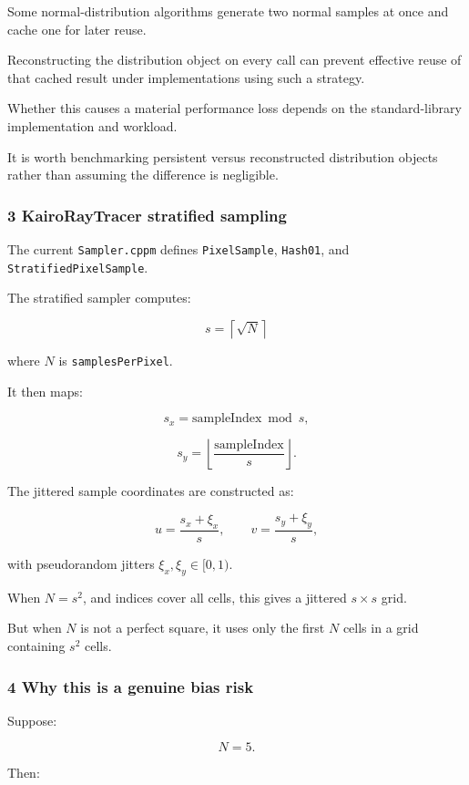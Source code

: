 Some normal-distribution algorithms generate two normal samples at once and cache one for later reuse.

Reconstructing the distribution object on every call can prevent effective reuse of that cached result under implementations using such a strategy.

Whether this causes a material performance loss depends on the standard-library implementation and workload.

It is worth benchmarking persistent versus reconstructed distribution objects rather than assuming the difference is negligible.

\subsubsection{3 KairoRayTracer stratified sampling}\label{02-foundations-ii-ch039-kairoraytracer-stratified-sampling}

The current \texttt{Sampler.cppm} defines \texttt{PixelSample}, \texttt{Hash01}, and \texttt{StratifiedPixelSample}.

The stratified sampler computes:

\[
 s=\left\lceil\sqrt N\right\rceil
\]

where \(N\) is \texttt{samplesPerPixel}.

It then maps:

\[
 s_x=\text{sampleIndex}\bmod s,
\]

\[
 s_y=\left\lfloor\frac{\text{sampleIndex}}s\right\rfloor.
\]

The jittered sample coordinates are constructed as:

\[
 u=\frac{s_x+\xi_x}{s}, \qquad v=\frac{s_y+\xi_y}{s},
\]

with pseudorandom jitters \(\xi_x,\xi_y\in[0,1)\).

When \(N=s^2\), and indices cover all cells, this gives a jittered \(s\times s\) grid.

But when \(N\) is not a perfect square, it uses only the first \(N\) cells in a grid containing \(s^2\) cells.

\subsubsection{4 Why this is a genuine bias risk}\label{02-foundations-ii-ch039-why-this-is-a-genuine-bias-risk}

Suppose:

\[
 N=5.
\]

Then:

